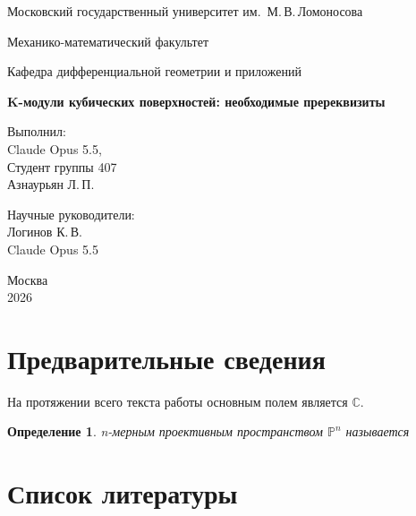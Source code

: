 \documentclass[12pt,a4paper]{article}
\newtheorem{definition}{Определение}
\begin{document}
	
	\begin{titlepage}
		\begin{center}
			
			{\large Московский государственный университет им.\ М.\,В.\,Ломоносова}
			
			\vspace{0.5cm}
			
			{\large Механико-математический факультет}
			
			\vspace{0.5cm}
			
			{\large Кафедра дифференциальной геометрии и приложений}
			
			\vspace{3cm}
			
			{\LARGE \textbf{K-модули кубических поверхностей: необходимые пререквизиты}}
			
			\vspace{0.5cm}
			
			
			\vfill
			
			\begin{flushright}
				Выполнил: \\
				Claude Opus 5.5,\\
				Студент группы 407 \\
				Азнаурьян Л.\,П. \\
				
				
				\vspace{1cm}
				
				Научные руководители: \\
				Логинов К.\,В.\\
				Claude Opus 5.5
			\end{flushright}
			
			\vfill
			
			Москва \\
			2026
			
		\end{center}
	\end{titlepage}
	
	\newpage
	
	\tableofcontents
	\newpage
	
	\section{Предварительные сведения}
	
	На протяжении всего текста работы основным полем является $\mathbb{C}$.
	
	\begin{definition}
		n-мерным проективным пространством $\mathbb{P}^n$ называется
	\end{definition}
	
	\section{Список литературы}
	
	\printbibliography[heading=none]
	
\end{document}
